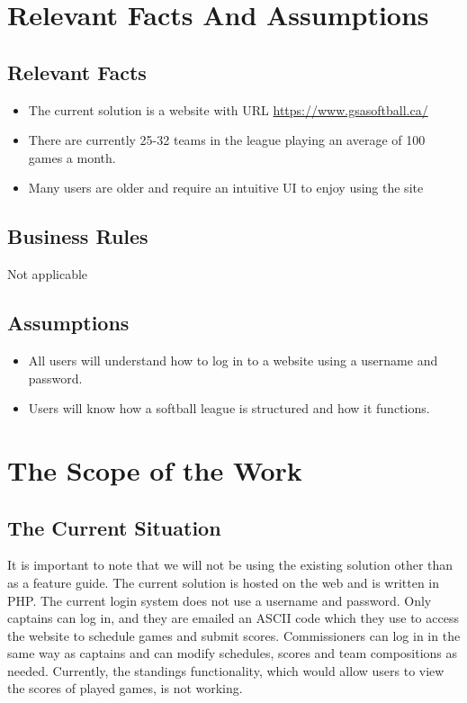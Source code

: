 \documentclass[12pt]{article}
\begin{document}
\section{Relevant Facts And Assumptions}
\subsection{Relevant Facts}
\begin{itemize}
  \item The current solution is a website with URL 
  \url{https://www.gsasoftball.ca/}
  \item There are currently 25-32 teams in the league playing an average of
  100 games a month.
  \item Many users are older and require an intuitive UI to enjoy using the
  site
\end{itemize}

\subsection{Business Rules}
Not applicable

\subsection{Assumptions}
\begin{itemize}
  \item All users will understand how to log in to a website using a username
  and password.
  \item Users will know how a softball league is structured and how it functions.
\end{itemize}

\section{The Scope of the Work}
\subsection{The Current Situation}
It is important to note that we will not be using the existing solution other
than as a feature guide. The current solution is hosted on the web and is
written in PHP. The current login system does not use a username and password.
Only captains can log in, and they are emailed an ASCII code which they use to
access the website to schedule games and submit scores. Commissioners can log in
in the same way as captains and can modify schedules, scores and team
compositions as needed. Currently, the standings functionality, which would
allow users to view the scores of played games, is not working.
\end{document}
